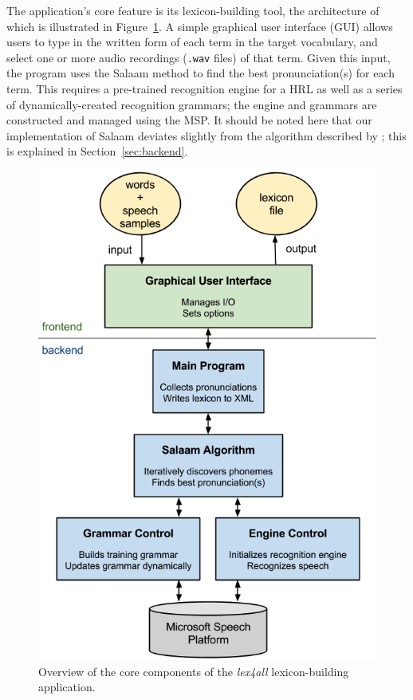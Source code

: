 \documentclass[11pt]{article}
\begin{document}
The application's core feature is its lexicon-building tool, the architecture of which is illustrated in Figure~\ref{fig:system}.
A simple graphical user interface (GUI) allows users to type in the written form of each term in the target vocabulary, and select one or more audio recordings (\texttt{.wav} files) of that term.
Given this input, the program uses the Salaam method 
to find the best pronunciation(s) for each term. This requires a pre-trained recognition engine for a HRL 
as well as a series of dynamically-created recognition grammars; the engine and grammars are constructed and managed using the MSP.
It should be noted here that 
our implementation of Salaam deviates slightly from the algorithm described by ; this is explained in Section~\ref{sec:backend}. 

\begin{figure}[t]
\begin{center}
\includegraphics[width=\columnwidth]{../img/SystemOverview-compact.png}
\caption{Overview of the core components of the \textit{lex4all} lexicon-building application.\label{fig:system}}
\end{center}
\end{figure}
\end{document}
